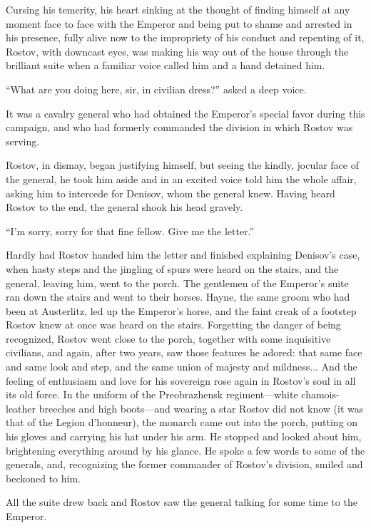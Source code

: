 Cursing his temerity, his heart sinking at the thought of finding
himself at any moment face to face with the Emperor and being put
to shame and arrested in his presence, fully alive now to the
impropriety of his conduct and repenting of it, Rostov, with
downcast eyes, was making his way out of the house through the
brilliant suite when a familiar voice called him and a hand
detained him.

``What are you doing here, sir, in civilian dress?'' asked a deep
voice.

It was a cavalry general who had obtained the Emperor's special
favor during this campaign, and who had formerly commanded the
division in which Rostov was serving.

Rostov, in dismay, began justifying himself, but seeing the
kindly, jocular face of the general, he took him aside and in an
excited voice told him the whole affair, asking him to intercede
for Denisov, whom the general knew. Having heard Rostov to the
end, the general shook his head gravely.

``I'm sorry, sorry for that fine fellow. Give me the letter.''

Hardly had Rostov handed him the letter and finished explaining
Denisov's case, when hasty steps and the jingling of spurs were
heard on the stairs, and the general, leaving him, went to the
porch. The gentlemen of the Emperor's suite ran down the stairs
and went to their horses. Hayne, the same groom who had been at
Austerlitz, led up the Emperor's horse, and the faint creak of a
footstep Rostov knew at once was heard on the stairs. Forgetting
the danger of being recognized, Rostov went close to the porch,
together with some inquisitive civilians, and again, after two
years, saw those features he adored: that same face and same look
and step, and the same union of majesty and mildness... And the
feeling of enthusiasm and love for his sovereign rose again in
Rostov's soul in all its old force. In the uniform of the
Preobrazhensk regiment---white chamois-leather breeches and high
boots---and wearing a star Rostov did not know (it was that of
the Legion d'honneur), the monarch came out into the porch,
putting on his gloves and carrying his hat under his arm. He
stopped and looked about him, brightening everything around by
his glance. He spoke a few words to some of the generals, and,
recognizing the former commander of Rostov's division, smiled and
beckoned to him.

All the suite drew back and Rostov saw the general talking for
some time to the Emperor.

